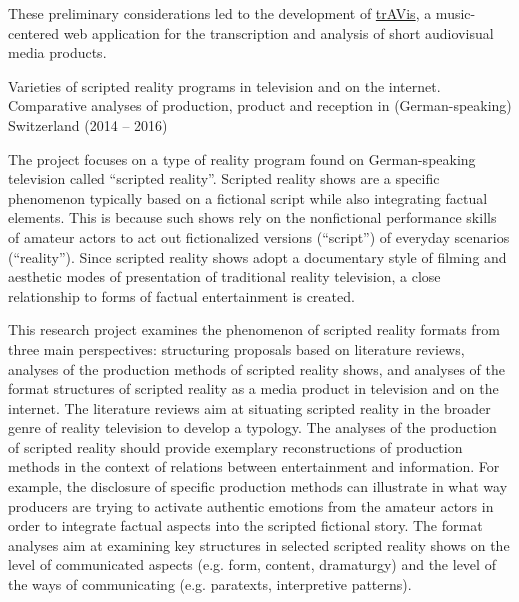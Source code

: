 \documentclass[9pt]{article}
\begin{document}
\noindent These preliminary considerations led to the development of \href{http://populaerkultur.unibas.ch/home/av-analyse/travis-en/}{trAVis}, a music-centered web application for the transcription and analysis of short audiovisual media products.

\medskip
{}


\pagebreak


\bigskip
{}
\newline\noindent\textsf{\large Varieties of scripted reality programs in television and on the internet. Comparative analyses of production, product and reception in (German-speaking) Switzerland (2014 – 2016)}
\smallskip

\noindent The project focuses on a type of reality program found on German-speaking television called ``scripted reality''. Scripted reality shows are a specific phenomenon typically based on a fictional script while also integrating factual elements. This is because such shows rely on the nonfictional performance skills of amateur actors to act out fictionalized versions (``script'') of everyday scenarios (``reality''). Since scripted reality shows adopt a documentary style of filming and aesthetic modes of presentation of traditional reality television, a close relationship to forms of factual entertainment is created.
\medskip

\noindent This research project examines the phenomenon of scripted reality formats from three main perspectives: structuring proposals based on literature reviews, analyses of the production methods of scripted reality shows, and analyses of the format structures of scripted reality as a media product in television and on the internet. The literature reviews aim at situating scripted reality in the broader genre of reality television to develop a typology. The analyses of the production of scripted reality should provide exemplary reconstructions of production methods in the context of relations between entertainment and information. For example, the disclosure of specific production methods can illustrate in what way producers are trying to activate authentic emotions from the amateur actors in order to integrate factual aspects into the scripted fictional story. The format analyses aim at examining key structures in selected scripted reality shows on the level of communicated aspects (e.g. form, content, dramaturgy) and the level of the ways of communicating (e.g. paratexts, interpretive patterns).
\medskip
\end{document}
